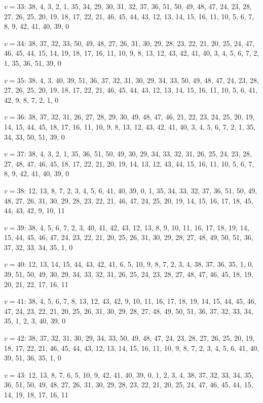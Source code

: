 \documentclass{amcjoucc}
\begin{document}
\begin{itemize}
{\item $v = 33$: 38, 4, 3, 2, 1, 35, 34, 29, 30, 31, 32, 37, 36, 51, 50, 49, 48, 47, 24, 23, 28, 27, 26, 25, 20, 19, 18, 17, 22, 21, 46, 45, 44, 43, 12, 13, 14, 15, 16, 11, 10, 5, 6, 7, 8, 9, 42, 41, 40, 39, 0
\item $v = 34$: 38, 37, 32, 33, 50, 49, 48, 27, 26, 31, 30, 29, 28, 23, 22, 21, 20, 25, 24, 47, 46, 45, 44, 15, 14, 19, 18, 17, 16, 11, 10, 9, 8, 13, 12, 43, 42, 41, 40, 3, 4, 5, 6, 7, 2, 1, 35, 36, 51, 39, 0
\item $v = 35$: 38, 4, 3, 40, 39, 51, 36, 37, 32, 31, 30, 29, 34, 33, 50, 49, 48, 47, 24, 23, 28, 27, 26, 25, 20, 19, 18, 17, 22, 21, 46, 45, 44, 43, 12, 13, 14, 15, 16, 11, 10, 5, 6, 41, 42, 9, 8, 7, 2, 1, 0
\item $v = 36$: 38, 37, 32, 31, 26, 27, 28, 29, 30, 49, 48, 47, 46, 21, 22, 23, 24, 25, 20, 19, 14, 15, 44, 45, 18, 17, 16, 11, 10, 9, 8, 13, 12, 43, 42, 41, 40, 3, 4, 5, 6, 7, 2, 1, 35, 34, 33, 50, 51, 39, 0
\item $v = 37$: 38, 4, 3, 2, 1, 35, 36, 51, 50, 49, 30, 29, 34, 33, 32, 31, 26, 25, 24, 23, 28, 27, 48, 47, 46, 45, 18, 17, 22, 21, 20, 19, 14, 13, 12, 43, 44, 15, 16, 11, 10, 5, 6, 7, 8, 9, 42, 41, 40, 39, 0
\item $v = 38$: 12, 13, 8, 7, 2, 3, 4, 5, 6, 41, 40, 39, 0, 1, 35, 34, 33, 32, 37, 36, 51, 50, 49, 48, 27, 26, 31, 30, 29, 28, 23, 22, 21, 46, 47, 24, 25, 20, 19, 14, 15, 16, 17, 18, 45, 44, 43, 42, 9, 10, 11
\item $v = 39$: 38, 4, 5, 6, 7, 2, 3, 40, 41, 42, 43, 12, 13, 8, 9, 10, 11, 16, 17, 18, 19, 14, 15, 44, 45, 46, 47, 24, 23, 22, 21, 20, 25, 26, 31, 30, 29, 28, 27, 48, 49, 50, 51, 36, 37, 32, 33, 34, 35, 1, 0
\item $v = 40$: 12, 13, 14, 15, 44, 43, 42, 41, 6, 5, 10, 9, 8, 7, 2, 3, 4, 38, 37, 36, 35, 1, 0, 39, 51, 50, 49, 30, 29, 34, 33, 32, 31, 26, 25, 24, 23, 28, 27, 48, 47, 46, 45, 18, 19, 20, 21, 22, 17, 16, 11
\item $v = 41$: 38, 4, 5, 6, 7, 8, 13, 12, 43, 42, 9, 10, 11, 16, 17, 18, 19, 14, 15, 44, 45, 46, 47, 24, 23, 22, 21, 20, 25, 26, 31, 30, 29, 28, 27, 48, 49, 50, 51, 36, 37, 32, 33, 34, 35, 1, 2, 3, 40, 39, 0
\item $v = 42$: 38, 37, 32, 31, 30, 29, 34, 33, 50, 49, 48, 47, 24, 23, 28, 27, 26, 25, 20, 19, 18, 17, 22, 21, 46, 45, 44, 43, 12, 13, 14, 15, 16, 11, 10, 9, 8, 7, 2, 3, 4, 5, 6, 41, 40, 39, 51, 36, 35, 1, 0
\item $v = 43$: 12, 13, 8, 7, 6, 5, 10, 9, 42, 41, 40, 39, 0, 1, 2, 3, 4, 38, 37, 32, 33, 34, 35, 36, 51, 50, 49, 48, 27, 26, 31, 30, 29, 28, 23, 22, 21, 20, 25, 24, 47, 46, 45, 44, 15, 14, 19, 18, 17, 16, 11
}
\end{itemize}
\end{document}
